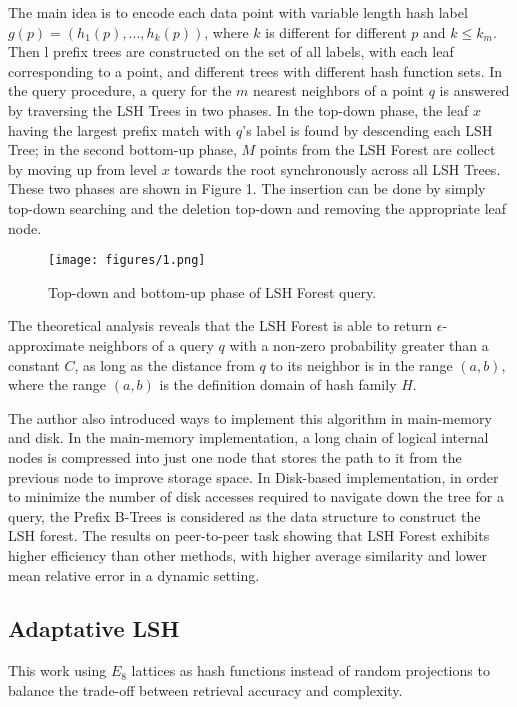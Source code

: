 The main idea is to encode each data point with variable length hash label $g(p)=(h_1(p), ..., h_k(p))$, where $k$ is different for different $p$ and $k\leq k_m$. Then l prefix trees are constructed on the set of all labels, with each leaf corresponding to a point, and different trees with different hash function sets. In the query procedure, a query for the $m$ nearest neighbors of a point $q$ is answered by traversing the LSH Trees in two phases. In the top-down phase, the leaf $x$ having the largest prefix match with $q$'s label is found by descending each LSH Tree; in the second bottom-up phase, $M$ points from the LSH Forest are collect by moving up from level $x$ towards the root synchronously across all LSH Trees. These two phases are shown in Figure 1. The insertion can be done by simply top-down searching and the deletion top-down and removing the appropriate leaf node.
\begin{figure*}
	\begin{center}
		\texttt{[image: figures/1.png]}
		\caption{Top-down and bottom-up phase of LSH Forest query.}
	\end{center}
\end{figure*}

The theoretical analysis reveals that the LSH Forest is able to return $\epsilon$-approximate neighbors of a query $q$ with a non-zero probability greater than a constant $C$, as long as the distance from $q$ to its neighbor is in the range $(a,b)$, where the range $(a,b)$ is the definition domain of hash family $H$. 

The author also introduced ways to implement this algorithm in main-memory and disk. In the main-memory implementation, a long chain of logical internal nodes is compressed into just one node that stores the path to it from the previous node to improve storage space. In Disk-based implementation, in order to minimize the number of disk accesses required to navigate down the tree for a query, the Prefix B-Trees is considered as the data structure to construct the LSH forest. The results on peer-to-peer task showing that LSH Forest exhibits higher efficiency than other methods, with higher average similarity and lower mean relative error in a dynamic setting.
\subsection{Adaptative LSH}
This work \cite{jegou2008query} using $E_8$ lattices as hash functions instead of random projections to balance the trade-off between retrieval accuracy and complexity.

